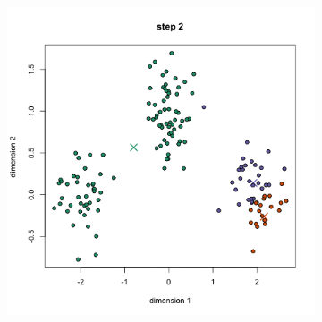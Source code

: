 \documentclass[a4paper, 14pt]{extarticle}
\begin{document}
\begin{figure}
\begin{subfigure}[b]{0.3\textwidth}
		\caption{}
	\end{subfigure}
	~ 
	\begin{subfigure}[b]{0.3\textwidth}
		\includegraphics[width=\textwidth]{k_2}
		\caption{}
	\end{subfigure}
	~ 
	

\end{figure}
\end{document}
